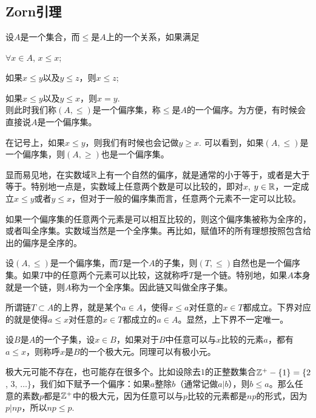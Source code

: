 \appendix
\renewcommand{\thepara}{\Alph{chapter}.\arabic{section}.\arabic{para}}

\chapter{}

\section{Zorn引理}
\para 设$A$是一个集合，而$\leq$是$A$上的一个关系，如果满足

\begin{compactenum}[~~~(1)]
\item $\forall x\in A$, $x\leq x$;
\item 如果$x\leq y$以及$y\leq z$，则$x\leq z$;
\item 如果$x\leq y$以及$y \leq x$，则$x=y$.\\则此时我们称$(A,\leq)$是一个偏序集，称$\leq$是$A$的一个偏序。为方便，有时候会直接说$A$是一个偏序集。
\end{compactenum}

在记号上，如果$x\leq y$，则我们有时候也会记做$y\geq x$. 可以看到，如果$(A,\leq)$是一个偏序集，则$(A,\geq)$也是一个偏序集。

显而易见地，在实数域$\mathbb{R}$上有一个自然的偏序，就是通常的小于等于，或者是大于等于。特别地一点是，实数域上任意两个数是可以比较的，即对$x$, $y\in \mathbb{R}$，一定成立$x\leq y$或者$y\leq x$，但对于一般的偏序集而言，任意两个元素不一定可以比较。

如果一个偏序集的任意两个元素是可以相互比较的，则这个偏序集被称为全序的，或者叫全序集。实数域当然是一个全序集。再比如，赋值环的所有理想按照包含给出的偏序是全序的。

\para 设$(A,\leq)$是一个偏序集，而$T$是一个$A$的子集，则$(T,\leq)$自然也是一个偏序集。如果$T$中的任意两个元素可以比较，这就称呼$T$是一个链。特别地，如果$A$本身就是一个链，则$A$称为一个全序集。因此链又叫做全序子集。

\para 所谓链$T\subset A$的上界，就是某个$a\in A$，使得$x\leq a$对任意的$x\in T$都成立。下界对应的就是使得$a\leq x$对任意的$x\in T$都成立的$a\in A$。显然，上下界不一定唯一。

\para 设$B$是$A$的一个子集，设$x\in B$，如果对于$B$中任意可以与$x$比较的元素$a$，都有$a\leq x$，则称呼$x$是$B$的一个极大元。同理可以有极小元。

极大元可能不存在，也可能存在很多个。比如设除去$1$的正整数集合$\mathbb{Z}^+-\{1\}=\{2$, $3$, $\dots\}$，我们如下赋予一个偏序：如果$a$整除$b$（通常记做$a|b$），则$b\leq a$。那么任意的素数$p$都是$\mathbb{Z}^+$中的极大元，因为任意可以与$p$比较的元素都是$np$的形式，因为$p|np$，所以$np\leq p$.

